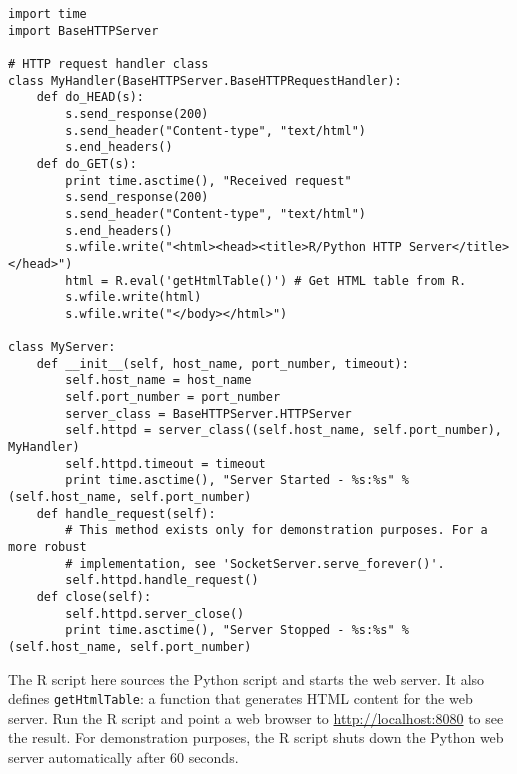 \documentclass[
article,
11pt, %
a4paper, %
oneside, %
headinclude,footinclude, %
]{scrartcl}
\theoremstyle{definition} %
\theoremstyle{plain} %
\theoremstyle{remark} %
\newcommand{\code}[1]{\texttt{#1}}
\begin{document}
\begin{verbatim}
import time
import BaseHTTPServer

# HTTP request handler class
class MyHandler(BaseHTTPServer.BaseHTTPRequestHandler):
    def do_HEAD(s):
        s.send_response(200)
        s.send_header("Content-type", "text/html")
        s.end_headers()
    def do_GET(s):
        print time.asctime(), "Received request"
        s.send_response(200)
        s.send_header("Content-type", "text/html")
        s.end_headers()
        s.wfile.write("<html><head><title>R/Python HTTP Server</title></head>")
        html = R.eval('getHtmlTable()') # Get HTML table from R.
        s.wfile.write(html)
        s.wfile.write("</body></html>")

class MyServer:
    def __init__(self, host_name, port_number, timeout):
        self.host_name = host_name
        self.port_number = port_number
        server_class = BaseHTTPServer.HTTPServer
        self.httpd = server_class((self.host_name, self.port_number), MyHandler)
        self.httpd.timeout = timeout
        print time.asctime(), "Server Started - %s:%s" % (self.host_name, self.port_number)
    def handle_request(self):
        # This method exists only for demonstration purposes. For a more robust
        # implementation, see 'SocketServer.serve_forever()'.
        self.httpd.handle_request()
    def close(self):
        self.httpd.server_close()
        print time.asctime(), "Server Stopped - %s:%s" % (self.host_name, self.port_number)
\end{verbatim}

The R script here sources the Python script and starts the web server. It also defines \code{getHtmlTable}: a function that generates HTML content for the web server. Run the R script and point a web browser to \url{http://localhost:8080} to see the result. For demonstration purposes, the R script shuts down the Python web server automatically after 60 seconds.
\end{document}
